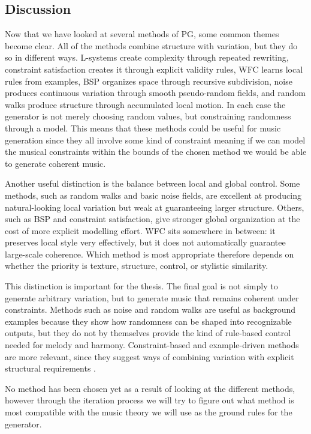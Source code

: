 \subsection{Discussion}
  Now that we have looked at several methods of \ac{PG}, some common themes become clear. All of the methods combine structure with variation, but they do so in different ways. L-systems create complexity through repeated rewriting, constraint satisfaction creates it through explicit validity rules, \ac{WFC} learns local rules from examples, \ac{BSP} organizes space through recursive subdivision, noise produces continuous variation through smooth pseudo-random fields, and random walks produce structure through accumulated local motion. In each case the generator is not merely choosing random values, but constraining randomness through a model. This means that these methods could be useful for music generation since they all involve some kind of constraint meaning if we can model the musical constraints within the bounds of the chosen method we would be able to generate coherent music. 

  Another useful distinction is the balance between local and global control. Some methods, such as random walks and basic noise fields, are excellent at producing natural-looking local variation but weak at guaranteeing larger structure. Others, such as \ac{BSP} and constraint satisfaction, give stronger global organization at the cost of more explicit modelling effort. \ac{WFC} sits somewhere in between: it preserves local style very effectively, but it does not automatically guarantee large-scale coherence. Which method is most appropriate therefore depends on whether the priority is texture, structure, control, or stylistic similarity.

  This distinction is important for the thesis. The final goal is not simply to generate arbitrary variation, but to generate music that remains coherent under constraints. Methods such as noise and random walks are useful as background examples because they show how randomness can be shaped into recognizable outputs, but they do not by themselves provide the kind of rule-based control needed for melody and harmony. Constraint-based and example-driven methods are more relevant, since they suggest ways of combining variation with explicit structural requirements \cite{andersConstraintProgrammingSystems2011,guminWaveFunctionCollapse2016,vargaProceduralMixedinitiativeMusic2023}.

  No method has been chosen yet as a result of looking at the different methods, however through the iteration process we will try to figure out what method is most compatible with the music theory we will use as the ground rules for the generator.
